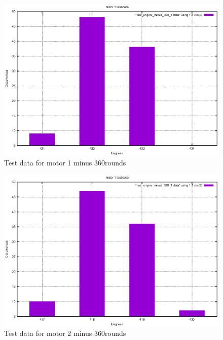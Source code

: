 \begin{figure}[ht]
  \includegraphics{graphics/test_graphs/test_engine_minus_360_1.eps}
  \caption{Test data for motor 1 minus 360\textdegree rounds}
  \centering
  \label{fig:td_m1_minus}
\end{figure}

\begin{figure}[ht]
  \includegraphics{graphics/test_graphs/test_engine_minus_360_2.eps}
  \caption{Test data for motor 2 minus 360\textdegree rounds}
  \centering
  \label{fig:td_m2_minus}
\end{figure}

